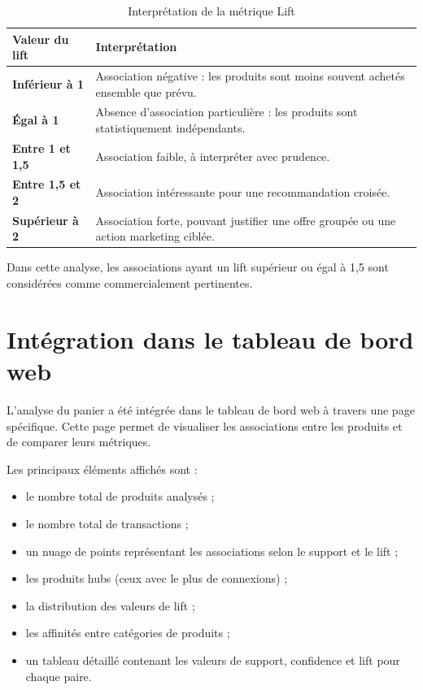 \documentclass[12pt,a4paper,twoside]{report}
\begin{document}
\begin{table}[H]
\centering
{}
\begin{tabularx}{\textwidth}{>{\bfseries}p{3cm}X}
\toprule
\rowcolor{TableHeader}
\color{white}\textbf{Valeur du lift} & \color{white}\textbf{Interprétation} \\
\midrule
Inférieur à 1 & Association négative : les produits sont moins souvent achetés ensemble que prévu. \\
Égal à 1 & Absence d'association particulière : les produits sont statistiquement indépendants. \\
Entre 1 et 1,5 & Association faible, à interpréter avec prudence. \\
Entre 1,5 et 2 & Association intéressante pour une recommandation croisée. \\
Supérieur à 2 & Association forte, pouvant justifier une offre groupée ou une action marketing ciblée. \\
\bottomrule
\end{tabularx}
\caption{Interprétation de la métrique Lift}
\label{tab:interpretation-lift}
\end{table}

Dans cette analyse, les associations ayant un lift supérieur ou égal à 1,5 sont considérées comme commercialement pertinentes.

\section{Intégration dans le tableau de bord web}

L'analyse du panier a été intégrée dans le tableau de bord web à travers une page spécifique. Cette page permet de visualiser les associations entre les produits et de comparer leurs métriques.

Les principaux éléments affichés sont :
\begin{itemize}
  \item le nombre total de produits analysés ;
  \item le nombre total de transactions ;
  \item un nuage de points représentant les associations selon le support et le lift ;
  \item les produits hubs (ceux avec le plus de connexions) ;
  \item la distribution des valeurs de lift ;
  \item les affinités entre catégories de produits ;
  \item un tableau détaillé contenant les valeurs de support, confidence et lift pour chaque paire.
\end{itemize}
\end{document}
